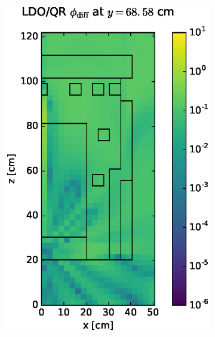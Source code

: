 \documentclass{article} %
\begin{document}
\begin{figure}[!hbt]
\centering
\begin{subfigure}{0.4\textwidth}
\includegraphics[max height=0.445\textheight]
{img/dlvn-flux-diff-qr.eps}
\end{subfigure} ~
\begin{subfigure}{0.4\textwidth}

\end{subfigure}
\end{figure}
\end{document}
